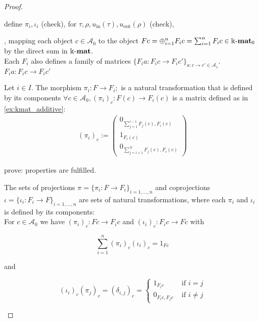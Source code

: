 \begin{proof}
\begin{enumerate}
\begin{subproof}[Proof of (ii)]
\begin{itemize}
\begin{itemize}
\end{itemize}

define $\pi_{i}, \iota_{i}$ (check), for $\tau, \rho, u_{\mathrm{in}}(\tau), u_{\mathrm{out}}(\rho)$ (check),

, mapping
each object $c \in \mathcal{A}_{0}$ to the object $Fc = \oplus_{i=1}^{n} F_{i}c = \sum_{i=1}^{n} F_{i}c \in \Bbbk\textnormal{-}\mathbf{mat}_{0}$ by the direct sum in
$\Bbbk\textnormal{-}\mathbf{mat}$.\\
Each $F_{i}$ also defines a family of matrices $\{F_{i} a : F_{i} c \rightarrow F_{i} c' \}_{a : c \rightarrow c' \in \mathcal{A}_{1}}$.
$F_{i} a : F_{i} c \rightarrow F_{i} c'$


Let $i \in I$. The morphism $\pi_{i} : F \rightarrow F_{i};$ is a natural transformation that is defined by its components
$\forall c \in \mathcal{A}_{0}, (\pi_{i})_{c} : F(c) \rightarrow F_{i}(c)$ is a matrix defined as in \ref{ex:kmat_additive}:
\begin{align}
(\pi_{i})_{c} := \begin{pmatrix}
0_{\sum_{j=1}^{i-1} F_{j}(c), F_{i}(c)} \\
1_{F_{i}(c)} \\
0_{\sum_{j=i+1}^{N} F_{j}(c), F_{i}(c)}
\end{pmatrix}
\end{align}

\end{itemize}

prove:
properties are fulfilled.

The sets of projections $\pi = \{ \pi_{i} : F \rightarrow F_{i} \}_{i = 1,\dots,n}$ and coprojections
$\iota = \{ \iota_{i} : F_{i} \rightarrow F \}_{i = 1,\dots,n}$ are sets of natural transformations,
where each $\pi_{i}$ and $\iota_{i}$ is defined by its components:\\
For $c \in \mathcal{A}_{0}$ we have $(\pi_{i})_{c} : Fc \rightarrow F_{i}c$ and $(\iota_{i})_{c} : F_{i}c \rightarrow Fc$ with\\
\begin{minipage}{.35\textwidth}
\[
\sum_{i=1}^{n} (\pi_{i})_{c} (\iota_{i})_{c} = 1_{Fc}
\]
\end{minipage}
\begin{minipage}{.1\textwidth}
and
\end{minipage}
\begin{minipage}{.55\textwidth}
\[
(\iota_{i})_{c}(\pi_{j})_{c} = (\delta_{i,j})_{c} = \begin{cases}
1_{F_{i}c} & \text{ if } i = j \\
0_{F_{i}c, F_{j}c} & \text{ if } i \neq j
\end{cases}
\]
\end{minipage}


\end{subproof}
\end{enumerate}
\end{proof}

